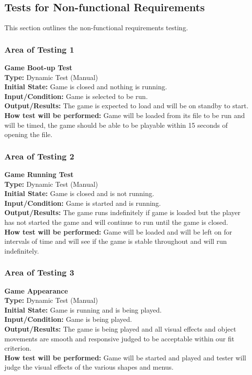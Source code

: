 \documentclass[12pt, titlepage]{article}
\begin{document}
\subsection{Tests for Non-functional Requirements}
\noindent This section outlines the non-functional requirements testing.
\subsubsection{Area of Testing 1}
\noindent \textbf{Game Boot-up Test}  \\
\textbf{Type:} Dynamic Test (Manual) \\
\textbf{Initial State:} Game is closed and nothing is running.\\
\textbf{Input/Condition:} Game is selected to be run.\\
\textbf{Output/Results:} The game is expected to load and will be on standby to start. \\
\textbf{How test will be performed:} Game will be loaded from its file to be run and will be timed, the game should be able to be playable within 15 seconds of opening the file.

\subsubsection{Area of Testing 2}
\noindent \textbf{Game Running Test} \\
\textbf{Type:} Dynamic Test (Manual) \\
\textbf{Initial State:} Game is closed and is not running. \\
\textbf{Input/Condition:} Game is started and is running. \\
\textbf{Output/Results:} The game runs indefinitely if game is loaded but the player has not started the game and will continue to run until the game is closed. \\
\textbf{How test will be performed:} Game will be loaded and will be left on for intervals of time and will see if the game is stable throughout and will run indefinitely. 


\subsubsection{Area of Testing 3}
\noindent \textbf{Game Appearance} \\
\textbf{Type:} Dynamic Test (Manual) \\
\textbf{Initial State:} Game is running and is being played.\\
\textbf{Input/Condition:} Game is being played. \\
\textbf{Output/Results:} The game is being played and all visual effects and object movements are smooth and responsive judged to be acceptable within our fit criterion.\\
\textbf{How test will be performed:} Game will be started and played and tester will judge the visual effects of the various shapes and menus.
\end{document}
